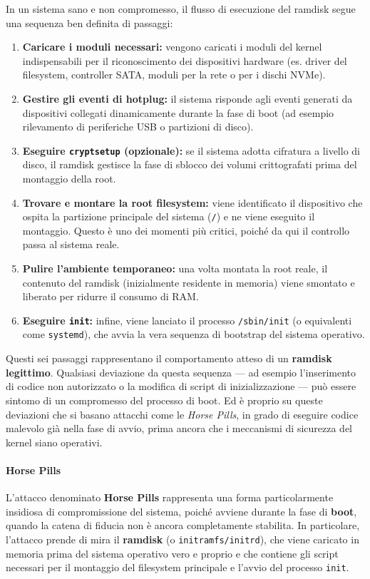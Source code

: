In un sistema sano e non compromesso, il flusso di esecuzione del ramdisk segue una sequenza ben definita di passaggi:
\begin{enumerate}
  \item \textbf{Caricare i moduli necessari:} vengono caricati i moduli del kernel indispensabili per il riconoscimento dei dispositivi hardware (es. driver del filesystem, controller SATA, moduli per la rete o per i dischi NVMe).
  \item \textbf{Gestire gli eventi di hotplug:} il sistema risponde agli eventi generati da dispositivi collegati dinamicamente durante la fase di boot (ad esempio rilevamento di periferiche USB o partizioni di disco).
  \item \textbf{Eseguire \texttt{cryptsetup} (opzionale):} se il sistema adotta cifratura a livello di disco, il ramdisk gestisce la fase di sblocco dei volumi crittografati prima del montaggio della root.
  \item \textbf{Trovare e montare la root filesystem:} viene identificato il dispositivo che ospita la partizione principale del sistema (\texttt{/}) e ne viene eseguito il montaggio.
  Questo è uno dei momenti più critici, poiché da qui il controllo passa al sistema reale.
  \item \textbf{Pulire l’ambiente temporaneo:} una volta montata la root reale, il contenuto del ramdisk (inizialmente residente in memoria) viene smontato e liberato per ridurre il consumo di RAM.
  \item \textbf{Eseguire \texttt{init}:} infine, viene lanciato il processo \texttt{/sbin/init} (o equivalenti come \texttt{systemd}), che avvia la vera sequenza di bootstrap del sistema operativo.
\end{enumerate}

Questi sei passaggi rappresentano il comportamento atteso di un \textbf{ramdisk legittimo}.
Qualsiasi deviazione da questa sequenza — ad esempio l’inserimento di codice non autorizzato o la modifica di script di inizializzazione — può essere sintomo di un compromesso del processo di boot.
Ed è proprio su queste deviazioni che si basano attacchi come le \textit{Horse Pills}, in grado di eseguire codice malevolo già nella fase di avvio, prima ancora che i meccanismi di sicurezza del kernel siano operativi.



\paragraph{Horse Pills}
L’attacco denominato \textbf{Horse Pills} rappresenta una forma particolarmente insidiosa di compromissione del sistema, poiché avviene durante la fase di \textbf{boot}, quando la catena di fiducia non è ancora completamente stabilita.
In particolare, l’attacco prende di mira il \textbf{ramdisk} (o \texttt{initramfs/initrd}), che viene caricato in memoria prima del sistema operativo vero e proprio e che contiene gli script necessari per il montaggio del filesystem principale e l’avvio del processo \texttt{init}.

